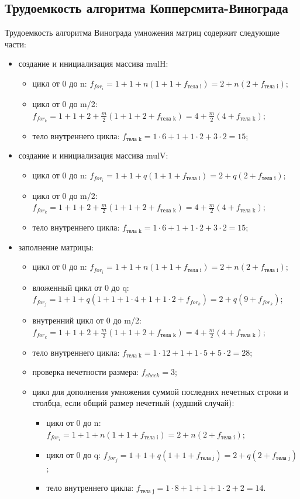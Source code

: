 \documentclass[a4paper,oneside,14pt]{extreport}
\begin{document}
\subsection{Трудоемкость алгоритма Копперсмита-Винограда}
Трудоемкость алгоритма Винограда умножения матриц содержит следующие части:
\begin{itemize}
	\item создание и инициализация массива mulH:
	\begin{itemize}
		\item цикл от 0 до n: $f_{for_i}=1 + 1 + n(1 + 1 + f_{\text{тела i}}) = 2 + n(2 + f_{\text{тела i}})$;
		\item цикл от 0 до m/2: $f_{for_k}=1 + 1 + 2 + \frac{m}{2}(1 + 1 + 2 + f_{\text{тела k}}) = 4 + \frac{m}{2}(4 + f_{\text{тела k}})$;
		\item тело внутреннего цикла: $f_{\text{тела k}} = 1 \cdot 6 + 1 + 1\cdot2 + 3 \cdot 2 = 15$;
	\end{itemize}
	\item создание и инициализация массива mulV:
	\begin{itemize}
		\item цикл от 0 до n: $f_{for_i}=1 + 1 + q(1 + 1 + f_{\text{тела i}}) = 2 + q(2 + f_{\text{тела i}})$;
		\item цикл от 0 до m/2: $f_{for_k}=1 + 1 + 2 + \frac{m}{2}(1 + 1 + 2 + f_{\text{тела k}}) = 4 + \frac{m}{2}(4 + f_{\text{тела k}})$;
		\item тело внутреннего цикла: $f_{\text{тела k}} = 1 \cdot 6 + 1 + 1\cdot2 + 3 \cdot 2 = 15$;
	\end{itemize}
	\item заполнение матрицы:
	\begin{itemize}
		\item цикл от 0 до n: $f_{for_i}=1 + 1 + n(1 + 1 + f_{\text{тела i}}) = 2 + n(2 + f_{\text{тела i}})$;
		\item вложенный цикл от 0 до q: $f_{for_j}=1 + 1 +q(1 + 1 +	1 \cdot 4 + 1 + 1 \cdot 2 + f_{for_k}) = 2 + q(9 + f_{for_k})$;
		\item внутренний цикл от 0 до m/2: $f_{for_k}=1 + 1 + 2 + \frac{m}{2}(1 + 1 + 2 + f_{\text{тела k}}) = 4 + \frac{m}{2}(4 + f_{\text{тела k}})$;
		\item тело внутреннего цикла: $f_{\text{тела k}} = 1 \cdot 12 + 1 + 1 \cdot 5 + 5 \cdot 2 = 28$;
		\item проверка нечетности размера: $f_{check} = 3$;
	\item цикл для дополнения умножения суммой последних нечетных строки и столбца, если общий размер нечетный (худший случай):
	\begin{itemize}
		\item цикл  от 0 до n: $f_{for_i}=1 + 1 + n(1 + 1 + f_{\text{тела i}}) = 2 + n(2 + f_{\text{тела i}})$;
		\item цикл от 0 до q: $f_{for_j}=1 + 1 +q(1 + 1 + f_{\text{тела j}}) = 2 + q(2 + f_{\text{тела j}})$;
		\item тело внутреннего цикла: $f_{\text{тела j}} = 1 \cdot 8 + 1 + 1 + 1 \cdot 2 + 2  = 14$.
	\end{itemize}
	

\end{itemize}
\end{itemize}
\end{document}
